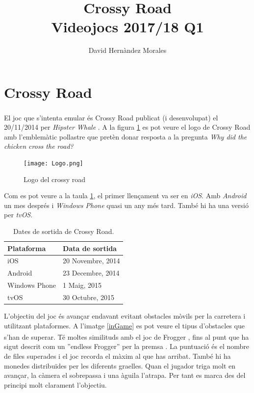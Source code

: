 \documentclass{article}
\title{Crossy Road \\
		\large Videojocs 2017/18 Q1}
\author{David Hernàndez Morales}
\begin{document}
\maketitle
\newpage
{}
\section{Crossy Road}
El joc que s'intenta emular és Crossy Road \textsuperscript{\texttrademark}
publicat (i desenvolupat) el 20/11/2014 per \textit{Hipster Whale} \cite{webCrossy}
\cite{wikipediaCrossy}. A la figura \ref{logo} es pot veure el logo de Crossy Road 
amb l'emblemàtic pollastre que pretèn donar resposta a la pregunta 
\textit{Why did the chicken cross the road?} \cite{preguntaChicken} 

\begin{figure}[h!]
	\texttt{[image: Logo.png]}
	\caption{Logo del crossy road}
	\label{logo}
\end{figure}

Com es pot veure a la taula \ref{dadesSortida}, el primer llençament va ser en
\textit{iOS}. Amb \textit{Android} un mes després i \textit{Windows Phone}
quasi un any més tard. També hi ha una versió per \textit{tvOS}.

\begin{table}[h!]
	\begin{center}		
		\label{dadesSortida}
		\begin{tabular}{l|l}
		\textbf{Plataforma} & \textbf{Data de sortida} \\
		\hline
		iOS & 20 Novembre, 2014 \\
		Android & 23 Decembre, 2014 \\
		Windows Phone & 1 Maig, 2015 \\
		tvOS & 30 Octubre, 2015		
		\end{tabular}
		\caption{Dates de sortida de Crossy Road.}
	\end{center}
\end{table}

L'objectiu del joc és avançar endavant evitant obstacles mòvils per la 
carretera i utilitzant plataformes. A l'imatge \ref{inGame}
es pot veure el tipus d'obstacles que s'han de superar.
Té moltes similituds amb el joc de
Frogger \textsuperscript{\texttrademark}, fins al punt que ha sigut
descrit com un ''endless Frogger'' per la premsa \cite{endlessFrogger1} 
\cite{endlessFrogger2}. La puntuació és el nombre de files superades i
el joc recorda el màxim al que has arribat. També hi ha monedes distribuïdes
per les diferents graelles. Quan el jugador triga molt en avançar, la càmera
el sobrepassa i una àguila l'atrapa. Per tant es marca des del principi molt
clarament l'objectiu. \newline
\end{document}
